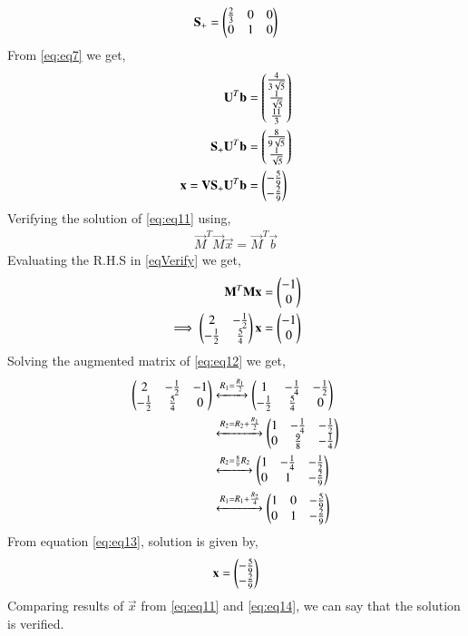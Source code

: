 \documentclass[journal,12pt,twocolumn]{IEEEtran}
\begin{document}
\begin{align}
\mathbf{S_+} = \begin{pmatrix}\frac{2}{3}&0&0\\0&1&0\end{pmatrix}
\end{align}
From \eqref{eq:eq7} we get,
\begin{align}
\mathbf{U}^T\mathbf{b}&=\begin{pmatrix}\frac{4}{3\sqrt{5}}\\\frac{1}{\sqrt{5}}\\\frac{11}{3}\end{pmatrix}\\
\mathbf{S_+}\mathbf{U}^T\mathbf{b}&=\begin{pmatrix}\frac{8}{9\sqrt{5}}\\\frac{1}{\sqrt{5}}\end{pmatrix}\\
\mathbf{x} = \mathbf{V}\mathbf{S_+}\mathbf{U}^T\mathbf{b} &= \begin{pmatrix}-\frac{5}{9}\\-\frac{2}{9}\end{pmatrix} \label{eq:eq11}
\end{align}
Verifying the solution of \eqref{eq:eq11} using,
\begin{align}
\vec{M}^T\vec{M}\vec{x} = \vec{M}^T\vec{b}\label{eqVerify}
\end{align}
Evaluating the R.H.S in \eqref{eqVerify} we get,
\begin{align}
\mathbf{M}^T\mathbf{M}\mathbf{x} &= \begin{pmatrix}-1\\0\end{pmatrix}\\
\implies\begin{pmatrix}2&-\frac{1}{2}\\-\frac{1}{2}&\frac{5}{4}\end{pmatrix}\mathbf{x} &= \begin{pmatrix}-1\\0\end{pmatrix}\label{eq:eq12}
\end{align}
Solving the augmented matrix of \eqref{eq:eq12} we get,
\begin{align}
\begin{pmatrix}2&-\frac{1}{2}&-1\\-\frac{1}{2}&\frac{5}{4}&0\end{pmatrix} &\xleftrightarrow{R_1=\frac{R_1}{2}}\begin{pmatrix}1&-\frac{1}{4}&-\frac{1}{2}\\-\frac{1}{2}&\frac{5}{4}&0\end{pmatrix}\\
&\xleftrightarrow{R_2=R_2+\frac{R_1}{2}}\begin{pmatrix}1&-\frac{1}{4}&-\frac{1}{2}\\0&\frac{9}{8}&-\frac{1}{4}\end{pmatrix}\\
&\xleftrightarrow{R_2=\frac{8}{9}R_2}\begin{pmatrix}1&-\frac{1}{4}&-\frac{1}{2}\\0&1&-\frac{2}{9}\end{pmatrix}\\
&\xleftrightarrow{R_1=R_1+\frac{R_2}{4}}\begin{pmatrix}1&0&-\frac{5}{9}\\0&1&-\frac{2}{9}\end{pmatrix}\label{eq:eq13}
\end{align}
From equation \eqref{eq:eq13}, solution is given by,
\begin{align}
\mathbf{x}=\begin{pmatrix}-\frac{5}{9}\\-\frac{2}{9}\end{pmatrix}\label{eq:eq14}
\end{align}
Comparing results of $\vec{x}$ from \eqref{eq:eq11} and \eqref{eq:eq14}, we can say that the solution is verified.
\end{document}
